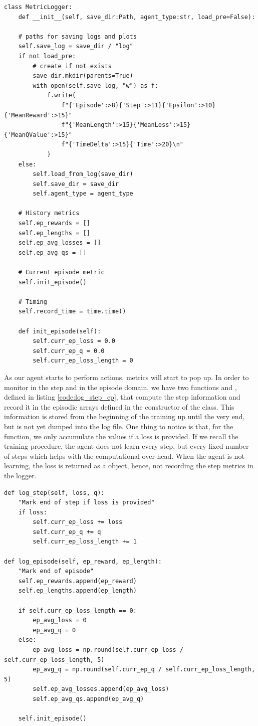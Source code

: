 \begin{lstlisting}[caption={MetricLogger class initialization}, label={code:metric_logger_class}]
class MetricLogger:
	def __init__(self, save_dir:Path, agent_type:str, load_pre=False):
	
	# paths for saving logs and plots
	self.save_log = save_dir / "log"
	if not load_pre:
		# create if not exists
		save_dir.mkdir(parents=True)
		with open(self.save_log, "w") as f:
			f.write(
				f"{'Episode':>8}{'Step':>11}{'Epsilon':>10}{'MeanReward':>15}"
				f"{'MeanLength':>15}{'MeanLoss':>15}{'MeanQValue':>15}"
				f"{'TimeDelta':>15}{'Time':>20}\n"
			)
	else:
		self.load_from_log(save_dir)
		self.save_dir = save_dir
		self.agent_type = agent_type
		
	# History metrics
	self.ep_rewards = []
	self.ep_lengths = []
	self.ep_avg_losses = []
	self.ep_avg_qs = []
	
	# Current episode metric
	self.init_episode()
	
	# Timing
	self.record_time = time.time()
	
	def init_episode(self):
		self.curr_ep_loss = 0.0
		self.curr_ep_q = 0.0
		self.curr_ep_loss_length = 0
\end{lstlisting}

As our agent starts to perform actions, metrics will start to pop up. In order to monitor in the step and in the episode domain, we have two functions  and , defined in listing \ref{code:log_step_ep}, that compute the step information and record it in the episodic arrays defined in the constructor of the class. This information is stored from the beginning of the training up until the very end, but is not yet dumped into the log file. One thing to notice is that, for the  function, we only accumulate the values if a loss is provided. If we recall the training procedure, the agent does not learn every step, but every fixed number of steps which helps with the computational over-head. When the agent is not learning, the loss is returned as a  object, hence, not recording the step metrics in the logger.

\begin{lstlisting}[caption={Step and episode functions for metrics extraction}, label={code:log_step_ep}]
def log_step(self, loss, q):
	"Mark end of step if loss is provided"
	if loss:
		self.curr_ep_loss += loss
		self.curr_ep_q += q
		self.curr_ep_loss_length += 1
	
def log_episode(self, ep_reward, ep_length):
	"Mark end of episode"
	self.ep_rewards.append(ep_reward)
	self.ep_lengths.append(ep_length)
	
	if self.curr_ep_loss_length == 0:
		ep_avg_loss = 0
		ep_avg_q = 0
	else:
		ep_avg_loss = np.round(self.curr_ep_loss / self.curr_ep_loss_length, 5)
		ep_avg_q = np.round(self.curr_ep_q / self.curr_ep_loss_length, 5)
		self.ep_avg_losses.append(ep_avg_loss)
		self.ep_avg_qs.append(ep_avg_q)
	
	self.init_episode()
\end{lstlisting}

